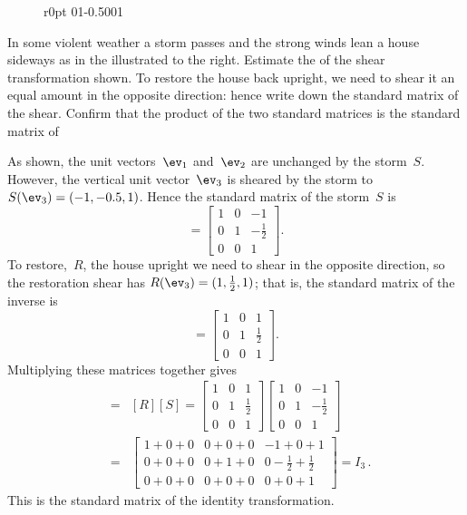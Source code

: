 \begin{wrapfigure}[8]r{0pt}
\def\unithousesize{small}
01{-0.5}001
\end{wrapfigure}
\begin{example} \label{eg:stormLT}
In some violent weather a storm passes and the strong winds lean a house sideways as in the  illustrated to the right.
Estimate the  of the shear transformation shown.
To restore the house back upright, we need to shear it an equal amount in the opposite direction: hence write down the standard matrix of the  shear.
Confirm that the product of the two standard matrices is the standard matrix of 
\begin{solution} 
As shown, the unit vectors~\(\ev_1\) and~\(\ev_2\) are unchanged by the storm~\(S\).  
However, the vertical unit vector~\(\ev_3\) is sheared by the storm to \(S(\ev_3)=(-1,-0.5,1)\).
Hence the standard matrix of the storm~\(S\) is
\begin{equation*}
[S]=\begin{bmatrix} 1&0&-1\\0&1&-\tfrac12\\0&0&1 \end{bmatrix}.
\end{equation*}
To restore,~\(R\), the house upright we need to shear in the opposite direction, so the restoration shear has \(R(\ev_3)=(1,\tfrac12,1)\); that is, the standard matrix of the inverse is
\begin{equation*}
[R]=\begin{bmatrix} 1&0&1\\0&1&\tfrac12\\0&0&1 \end{bmatrix}.
\end{equation*}
Multiplying these matrices together gives
\begin{eqnarray*}
[R\circ S]&=&[R][S]
=\begin{bmatrix} 1&0&1\\0&1&\tfrac12\\0&0&1 \end{bmatrix}
\begin{bmatrix} 1&0&-1\\0&1&-\tfrac12\\0&0&1 \end{bmatrix}
\\&=&\begin{bmatrix} 1+0+0&0+0+0&-1+0+1\\
0+0+0&0+1+0&0-\tfrac12+\tfrac12\\
0+0+0&0+0+0&0+0+1 \end{bmatrix}
=I_3\,.
\end{eqnarray*}
This is the standard matrix of the identity transformation.
\end{solution}
\end{example}


